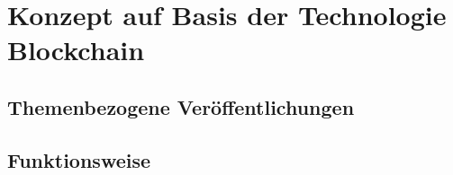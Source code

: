 \chapter{Konzept auf Basis der Technologie Blockchain}
\label{chap:entwicklung}

\section{Themenbezogene Veröffentlichungen}
\label{sec:themenbezogene_veroeffentlichungen}


\section{Funktionsweise}
\label{sec:grobkonzept}